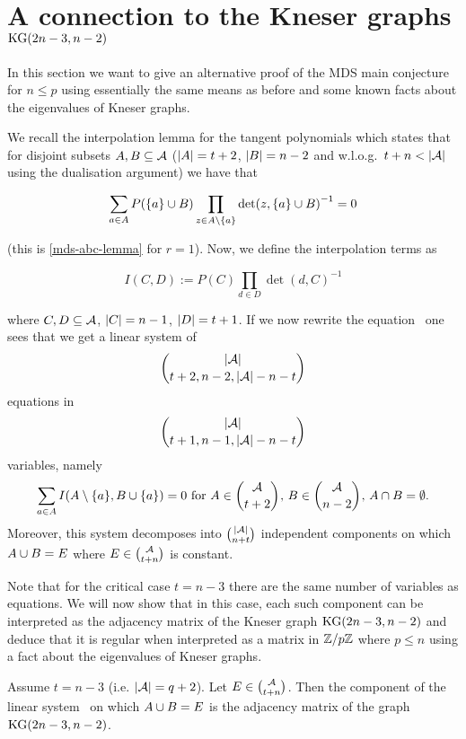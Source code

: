 
\section{A connection to the Kneser graphs $\mathop\mathrm{KG}(2n-3,n-2)$}\label{sec-mds-knes}

In this section we want to give an alternative proof of the MDS main conjecture for $n\leq p$ using essentially the same means as before and some known facts about the eigenvalues of Kneser graphs.

We recall the interpolation lemma for the tangent polynomials which states that for disjoint subsets $A,B\subseteq \mathcal{A}$ ($\left\vert{A}\right\vert=t+2$, $\left\vert{B}\right\vert=n-2$ and w.l.o.g.~$t+n < \left\vert{\mathcal{A}}\right\vert$ using the dualisation argument)
we have that

$$
\sum_{a\in A}{P(\set a\setjoin B)\prod_{z\in A\setminus \set a}{\det(z,\set a\setjoin B)}^{-1}}=0\label{mds-tan-poly-interpol}
$$

(this is \autoref{mds-abc-lemma} for $r=1$). Now, we define the interpolation terms as

$$
I(C,D):=P(C)\prod_{d\in D}{{\det(d,C)}^{-1}}
$$
  
where $C,D\subseteq \mathcal{A}$, $\left\vert{C}\right\vert=n-1$, $\left\vert{D}\right\vert=t+1$.
If we now rewrite the equation~ %
one sees that we get a linear system of
$$
\binom{\card\cA}{t+2,n-2,\card\cA-n-t}
$$
equations in
$$
\binom{\card\cA}{t+1,n-1,\card\cA-n-t}
$$
variables, namely
$$%
\sum_{a\in A}{I(A\setminus\{a\}, B\setjoin\{a\})}=0\text{ for $A\in\binom{\cA}{t+2}$, $B\in\binom{\cA}{n-2}$, $A\setmeet B=\emptyset$}.\label{mds-interpol-sys}
$$
Moreover, this system decomposes into $\binom{\card\cA}{n+t}$ independent components on which $A\cup B=E$ where $E\in\binom{\cA}{t+n}$ is constant.

Note that for the critical case $t=n-3$ there are the same number of variables as equations.
We will now show that in this case, each such component can be interpreted as the adjacency matrix of the Kneser graph $\mathop\mathrm{KG}(2n-3,n-2)$ and deduce that it is regular when interpreted as a matrix in $\mathbb{Z}/p\mathbb{Z}$ where $p\leq n$ using a fact about the eigenvalues of Kneser graphs.

\begin{lemma}
    Assume $t=n-3$ (i.e. $\left\vert{\mathcal{A}}\right\vert=q+2$).
    Let $E\in\binom{\cA}{t+n}$. Then the component of the linear system~
    on which $A\cup B=E$ is the adjacency matrix of the graph $\mathop\mathrm{KG}(2n-3,n-2)$.
\end{lemma} 

